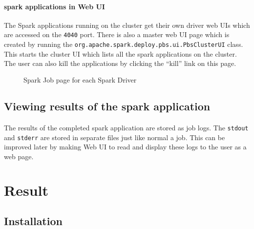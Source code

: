 \paragraph{\gls{spark} applications in Web UI} The Spark applications running on
the cluster get their own driver web UIs which are accessed on the \texttt{4040}
port. There is also a master web UI page which is created by running the
\texttt{org.apache.spark.deploy.pbs.ui.PbsClusterUI} class. This starts the
cluster UI which lists all the \gls{spark} applications on the cluster. The user
can also kill the applications by clicking the ``kill'' link on this page.

\begin{figure}[h]
    \centering
    \caption{Spark Job page for each Spark Driver}
\end{figure}


\subsection{Viewing results of the \gls{spark} application}

\paragraph{} The results of the completed \gls{spark} application are stored as
 job logs. The \texttt{stdout} and \texttt{stderr} are stored in
separate files just like normal a  job. This can be improved
later by making Web UI to read and display these logs to the user as a web page.


\newpage
\section{Result}

\subsection{Installation}
